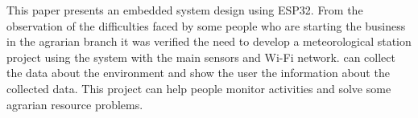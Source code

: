This paper presents an embedded system design using ESP32. From the observation of the difficulties faced by some people who are starting the business in the agrarian branch it was verified the need to develop a meteorological station project using the system with the main sensors and Wi-Fi network. can collect the data about the environment and show the user the information about the collected data. This project can help people monitor activities and solve some agrarian resource problems.




